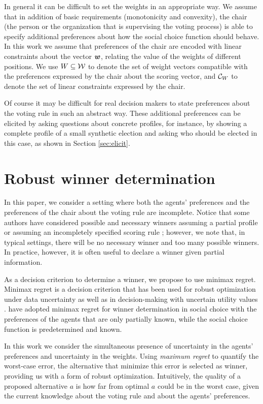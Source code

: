 In general it can be difficult to set the weights in an appropriate way.
We assume that in addition of basic requirements (monotonicity and convexity), the chair (the person or the organization that is supervising the voting process) is able to specify additional preferences about how the social choice function should behave.
In this work we assume that preferences of the chair are encoded with linear constraints about the vector $\bm{w}$, relating the value of the weights of different positions.
We use $W \subseteq \mathcal{W}$ to denote the set of weight vectors compatible with the preferences expressed by the chair about the scoring vector, and $\mathcal{C}_W$ to denote the set of linear constraints expressed by the chair.

Of course it may be difficult for real decision makers to state preferences about the voting rule in such an abstract way.
These additional preferences can be elicited by asking questions about concrete profiles, for instance, by showing a complete profile of a small synthetic election and asking who should be elected in this case, as shown in Section \ref{sec:elicit}.

\section[Minimax regret under partial profile and weight information]{
Robust winner determination}
\label{sec:mmr}
In this paper, we consider a setting where both the agents' preferences and the preferences of the chair about the voting rule are incomplete.
Notice that some authors have considered possible and necessary winners assuming a partial profile  \citep{Xia2008} or assuming an incompletely specified scoring rule \citep{Viappiani2018};
however, we note that, in typical settings, there will be no necessary winner and too many possible winners.
In practice, however, it is often useful to declare a winner given partial information.

As a decision criterion to determine a winner, we propose to use minimax regret. 
Minimax regret \citep{Savage1954} is a decision criterion that has been used for robust optimization under data uncertainty \citep{Kouvelis1997} as well as in decision-making with uncertain utility values \citep{Salo2001,Boutilier2006}.
\citet{Lu2011} have adopted minimax regret for winner determination in social choice with
the preferences of the agents that are only partially known, while the social choice function is predetermined and known.

In this work we consider the simultaneous presence of uncertainty in the agents' preferences and uncertainty in the weights.
Using {\em maximum regret} to quantify the worst-case error, the alternative that minimize this error is selected as winner, providing us with a form of robust optimization.
Intuitively, the quality of a proposed alternative $a$ is how far from optimal $a$  could be in the worst case, given the current knowledge about the voting rule and about the agents' preferences.

